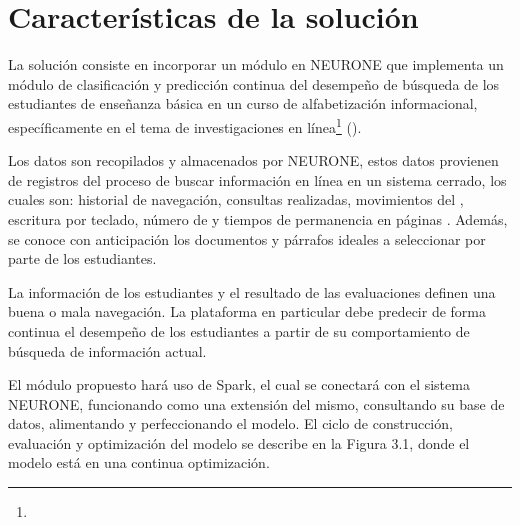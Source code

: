\section{Características de la solución}
\label{sec:caracteristicas-solucion}
La solución consiste en incorporar un módulo en NEURONE \parencite{gonzalez2017neurone} que implementa un módulo de clasificación y predicción continua del desempeño de búsqueda de los estudiantes de enseñanza básica en un curso de alfabetización informacional, específicamente en el tema de investigaciones en línea\footnote{\traduccionlibre} (). 

Los datos son recopilados y almacenados por NEURONE, estos datos provienen de registros del proceso de buscar información en línea en un sistema cerrado, los cuales son: historial de navegación, consultas realizadas, movimientos del , escritura por teclado, número de  y tiempos de permanencia en páginas . Además, se conoce con anticipación los documentos y párrafos ideales a seleccionar por parte de los estudiantes.

La información de los estudiantes y el resultado de las evaluaciones definen una buena o mala navegación. La plataforma en particular debe predecir de forma continua el desempeño de los estudiantes a partir de su comportamiento de búsqueda de información actual.

El módulo propuesto hará uso de Spark, el cual se conectará con el sistema NEURONE, funcionando como una extensión del mismo, consultando su base de datos, alimentando y perfeccionando el modelo. El ciclo de construcción, evaluación y optimización del modelo se describe en la Figura 3.1, donde el modelo está en una continua optimización.


\begin{figure}[htb]
	\centering
	
	\label{fig:docente_estudiante}
\end{figure}

\begin{figure}[htb]
	\centering
	
	\label{fig:ml-pipeline}
\end{figure}


